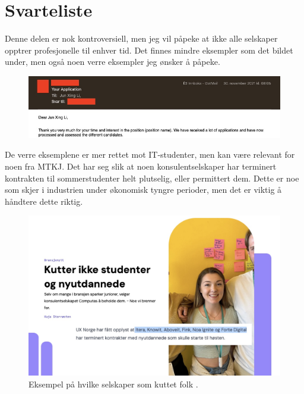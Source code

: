 \section{Svarteliste}

Denne delen er nok kontroversiell, men jeg vil påpeke at ikke alle selskaper opptrer profesjonelle til enhver tid. Det finnes mindre eksempler som det bildet under, men også noen verre eksempler jeg ønsker å påpeke.

\begin{figure}[H]
    \centering
    \includegraphics[width=1\linewidth]{images/mail.jpg}
\end{figure}

De verre eksemplene er mer rettet mot IT-studenter, men kan være relevant for noen fra MTKJ. Det har seg slik at noen konsulentselskaper har terminert kontrakten til sommerstudenter helt plutselig, eller permittert dem. Dette er noe som skjer i industrien under økonomisk tyngre perioder, men det er viktig å håndtere dette riktig.

\begin{figure}[H]
    \centering
    \includegraphics[width=0.8\linewidth]{images/uxnorge.jpg}
    \caption{Eksempel på hvilke selskaper som kuttet folk \cite{UXNorge2023}.}
\end{figure}